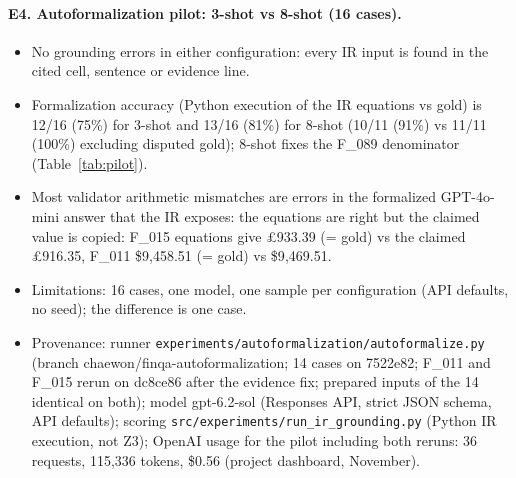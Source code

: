 \paragraph{E4. Autoformalization pilot: 3-shot vs 8-shot (16 cases).}
\begin{itemize}
\item No grounding errors in either configuration: every IR input is found in the cited cell, sentence or evidence line.
\item Formalization accuracy (Python execution of the IR equations vs gold) is 12/16 (75\%) for 3-shot and
  13/16 (81\%) for 8-shot (10/11 (91\%) vs
  11/11 (100\%) excluding disputed gold); 8-shot fixes the F\_089 denominator (Table~\ref{tab:pilot}).
\item Most validator arithmetic mismatches are errors in the formalized GPT-4o-mini answer that the IR exposes: the
  equations are right but the claimed value is copied: F\_015 equations give \pounds 933.39 (= gold) vs the claimed \pounds 916.35,
  F\_011 \$9{,}458.51 (= gold) vs \$9{,}469.51.
\item Limitations: 16 cases, one model, one sample per configuration (API defaults, no seed); the difference is one case.
\item Provenance: runner \texttt{experiments/autoformalization/autoformalize.py} (branch chaewon/finqa-autoformalization;
  14 cases on 7522e82; F\_011 and F\_015 rerun on dc8ce86 after the evidence fix; prepared inputs of the 14 identical on both);
  model gpt-6.2-sol (Responses API, strict JSON schema, API defaults); scoring \texttt{src/experiments/run\_ir\_grounding.py}
  (Python IR execution, not Z3); OpenAI usage for the pilot including both reruns: 36 requests, 115,336 tokens, \$0.56 (project dashboard, November).
\end{itemize}
